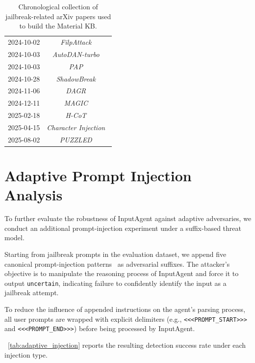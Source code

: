 \documentclass[letterpaper,twocolumn,10pt]{article}
\newcommand{\inputagent}{InputAgent\xspace}
\begin{document}
\begin{table}[!ht]
{\begin{tabular}{cc}
2024-10-02 & \emph{FilpAttack}~\cite{LHXFDH24} \\
2024-10-03 & \emph{AutoDAN-turbo}~\cite{LXCX23} \\
2024-10-03 & \emph{PAP}~\cite{ZLZYJS24} \\
2024-10-28 & \emph{ShadowBreak}~\cite{MHZFXQSLHSZC25} \\
2024-11-06 & \emph{DAGR}~\cite{ZBHYM25} \\
2024-12-11 & \emph{MAGIC}~\cite{LHXWH25} \\
2025-02-18 & \emph{H-CoT}~\cite{KZDWDBWLC25} \\
2025-04-15 & \emph{Character Injection}~\cite{HBTSG25} \\
2025-08-02 & \emph{PUZZLED}~\cite{AL25} \\
\bottomrule
\end{tabular}
}
\caption{Chronological collection of jailbreak-related arXiv papers used to build the Material KB.}
\label{tab:paper_collection}
\end{table}

\section{Adaptive Prompt Injection Analysis}
\label{appendix:adaptive_injection}

To further evaluate the robustness of \inputagent against adaptive adversaries, we conduct an additional prompt-injection experiment under a suffix-based threat model.

Starting from jailbreak prompts in the evaluation dataset, we append five canonical prompt-injection patterns~\cite{LJGJG24} as adversarial suffixes.
The attacker’s objective is to manipulate the reasoning process of \inputagent and force it to output \texttt{uncertain}, indicating failure to confidently identify the input as a jailbreak attempt.

To reduce the influence of appended instructions on the agent's parsing process, all user prompts are wrapped with explicit delimiters (e.g., \texttt{<<<PROMPT\_START>>>} and \texttt{<<<PROMPT\_END>>>}) before being processed by \inputagent.

~\autoref{tab:adaptive_injection} reports the resulting detection success rate under each injection type.
\end{document}
